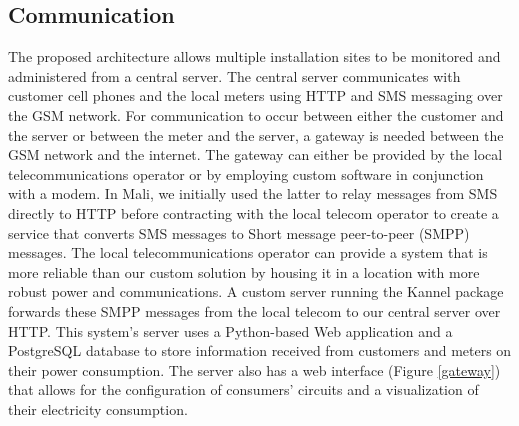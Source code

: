 \documentclass{sig-alternate}
\begin{document}
\subsection{Communication}
The proposed architecture allows multiple installation sites to be
monitored and administered from a central server.
The central server communicates with customer cell phones and the
local meters using HTTP and SMS messaging over the GSM
network.
For communication to occur between either the customer and the server
or between the meter and the server, a gateway is needed between
the GSM network and the internet.
The gateway can either be provided by the local telecommunications operator
or by employing custom software in conjunction with a modem.
In Mali, we initially used the latter to relay messages from SMS
directly to HTTP before contracting with the local telecom operator to
create a service that converts SMS messages to Short message
peer-to-peer (SMPP) messages.
The local telecommunications operator can provide a system that is
more reliable than our custom solution by housing it in a 
location with more robust power and communications.
A custom server running the Kannel package forwards
these SMPP messages from the local telecom to our central server over HTTP.
This system's server uses a Python-based Web application and a
PostgreSQL database to store information received from customers and
meters on their power consumption.
The server also has a web interface (Figure \ref{gateway}) that allows for
the configuration of consumers' circuits and a visualization of their
electricity consumption.
\end{document}
